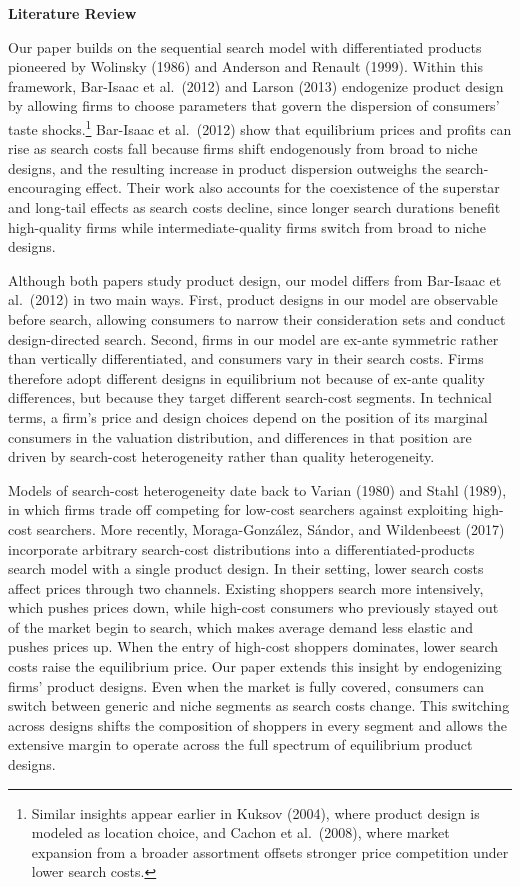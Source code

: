 \documentclass[14pt]{article}
\theoremstyle{plain}
\theoremstyle{definition}
\theoremstyle{remark}
\DeclareRobustCommand\1{\futurelet\oneNext\oneCheck}
\begin{document}
\medskip
\noindent \textbf{Literature Review}

Our paper builds on the sequential search model with differentiated products pioneered by Wolinsky (1986) and Anderson and Renault (1999). Within this framework, Bar-Isaac et al.\ (2012) and Larson (2013) endogenize product design by allowing firms to choose parameters that govern the dispersion of consumers' taste shocks.\footnote{Similar insights appear earlier in Kuksov (2004), where product design is modeled as location choice, and Cachon et al.\ (2008), where market expansion from a broader assortment offsets stronger price competition under lower search costs.} Bar-Isaac et al.\ (2012) show that equilibrium prices and profits can rise as search costs fall because firms shift endogenously from broad to niche designs, and the resulting increase in product dispersion outweighs the search-encouraging effect. Their work also accounts for the coexistence of the superstar and long-tail effects as search costs decline, since longer search durations benefit high-quality firms while intermediate-quality firms switch from broad to niche designs.

Although both papers study product design, our model differs from Bar-Isaac et al.\ (2012) in two main ways. First, product designs in our model are observable before search, allowing consumers to narrow their consideration sets and conduct design-directed search. Second, firms in our model are ex-ante symmetric rather than vertically differentiated, and consumers vary in their search costs. Firms therefore adopt different designs in equilibrium not because of ex-ante quality differences, but because they target different search-cost segments. In technical terms, a firm's price and design choices depend on the position of its marginal consumers in the valuation distribution, and differences in that position are driven by search-cost heterogeneity rather than quality heterogeneity.

Models of search-cost heterogeneity date back to Varian (1980) and Stahl (1989), in which firms trade off competing for low-cost searchers against exploiting high-cost searchers. More recently, Moraga-Gonz{\' a}lez, S{\' a}ndor, and Wildenbeest (2017) incorporate arbitrary search-cost distributions into a differentiated-products search model with a single product design. In their setting, lower search costs affect prices through two channels. Existing shoppers search more intensively, which pushes prices down, while high-cost consumers who previously stayed out of the market begin to search, which makes average demand less elastic and pushes prices up. When the entry of high-cost shoppers dominates, lower search costs raise the equilibrium price. Our paper extends this insight by endogenizing firms' product designs. Even when the market is fully covered, consumers can switch between generic and niche segments as search costs change. This switching across designs shifts the composition of shoppers in every segment and allows the extensive margin to operate across the full spectrum of equilibrium product designs.
\end{document}
